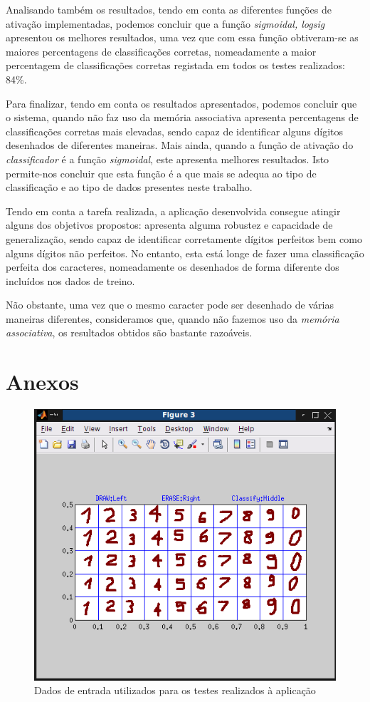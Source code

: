 \documentclass{article}
\begin{document}
Analisando também os resultados, tendo em conta as diferentes funções de ativação implementadas, podemos concluir que a função \emph{sigmoidal, logsig} apresentou os melhores resultados, uma vez que com essa função obtiveram-se as maiores percentagens de classificações corretas, nomeadamente a maior percentagem de classificações corretas registada em todos os testes realizados: 84\%.

Para finalizar, tendo em conta os resultados apresentados, podemos concluir que o sistema, quando não faz uso da memória associativa apresenta percentagens de classificações corretas mais elevadas, sendo capaz de identificar alguns dígitos desenhados de diferentes maneiras. Mais ainda, quando a função de ativação do \emph{classificador} é a função \emph{sigmoidal}, este apresenta melhores resultados. Isto permite-nos concluir que esta função é a que mais se adequa ao tipo de classificação e ao tipo de dados presentes neste trabalho.

Tendo em conta a tarefa realizada, a aplicação desenvolvida consegue atingir alguns dos objetivos propostos: apresenta alguma robustez e capacidade de generalização, sendo capaz de identificar corretamente dígitos perfeitos bem como alguns dígitos não perfeitos. No entanto, esta está longe de fazer uma classificação perfeita dos caracteres, nomeadamente os desenhados de forma diferente dos incluídos nos dados de treino.

Não obstante, uma vez que o mesmo caracter pode ser desenhado de várias maneiras diferentes, consideramos que, quando não fazemos uso da \emph{memória associativa}, os resultados obtidos são bastante razoáveis.

\pagebreak

\section{Anexos}

\begin{figure}[h]
  \centering
      \includegraphics[scale=0.3]{Input.png}
  \caption{Dados de entrada utilizados para os testes realizados à aplicação}
\end{figure}
\end{document}
